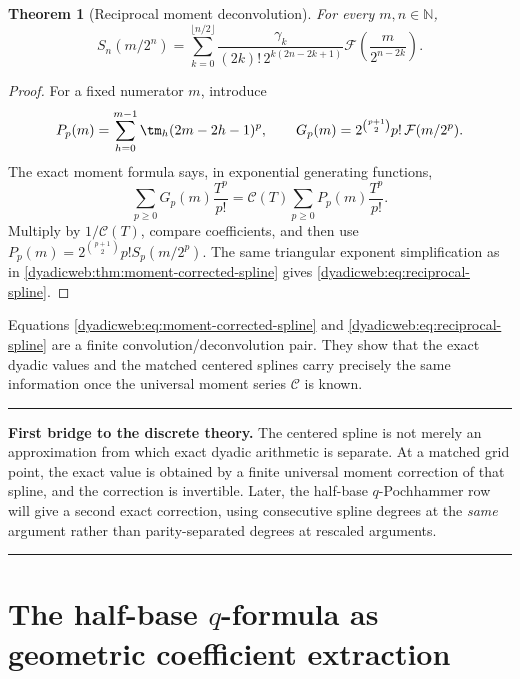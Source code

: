 \documentclass[11pt,oneside]{article}
\newtheorem{theorem}{Theorem}[section]
\theoremstyle{definition}
\theoremstyle{remark}
\newcommand{\N}{\mathbb N}
\newenvironment{boxedremark}{%
  \par\smallskip\noindent\begin{center}\begin{minipage}{0.94\textwidth}%
  \color{black}\hrule\vspace{0.6em}\small
}{%
  \vspace{0.6em}\hrule\end{minipage}\end{center}\smallskip
}
\begin{document}
\begin{theorem}[Reciprocal moment deconvolution]
\label{dyadicweb:thm:reciprocal-spline}
For every $m,n\in\N$,
\begin{equation}
 \boxed{
 S_n(m/2^n)=
 \sum_{k=0}^{\lfloor n/2\rfloor}
 \frac{\gamma_k}{(2k)!\,2^{k(2n-2k+1)}}
 \mathcal F\!\left(\frac{m}{2^{n-2k}}\right).}            \label{dyadicweb:eq:reciprocal-spline}
\end{equation}
\end{theorem}

\begin{proof}
For a fixed numerator $m$, introduce
\[
 P_p(m)=\sum_{h=0}^{m-1}\tm_h(2m-2h-1)^p,
 \qquad
 G_p(m)=2^{\binom{p+1}{2}}p!\,\mathcal F(m/2^p).
\]
The exact moment formula says, in exponential generating functions,
\[
 \sum_{p\ge0}G_p(m)\frac{T^p}{p!}
 =\mathscr C(T)\sum_{p\ge0}P_p(m)\frac{T^p}{p!}.
\]
Multiply by $1/\mathscr C(T)$, compare coefficients, and then use
$P_p(m)=2^{\binom{p+1}{2}}p!S_p(m/2^p)$.  The same triangular exponent simplification as in
\cref{dyadicweb:thm:moment-corrected-spline} gives \eqref{dyadicweb:eq:reciprocal-spline}.
\end{proof}

Equations \eqref{dyadicweb:eq:moment-corrected-spline} and \eqref{dyadicweb:eq:reciprocal-spline} are a finite
convolution/deconvolution pair.  They show that the exact dyadic values and the matched centered
splines carry precisely the same information once the universal moment series $\mathscr C$ is
known.

\begin{boxedremark}
\textbf{First bridge to the discrete theory.}
The centered spline is not merely an approximation from which exact dyadic arithmetic is
separate.  At a matched grid point, the exact value is obtained by a finite universal moment
correction of that spline, and the correction is invertible.  Later, the half-base
$q$-Pochhammer row will give a second exact correction, using consecutive spline degrees at
the \emph{same} argument rather than parity-separated degrees at rescaled arguments.
\end{boxedremark}

\section[The half-base q-formula as geometric coefficient extraction]{The half-base $q$-formula as geometric coefficient extraction}
\label{dyadicweb:sec:q-extraction}
\end{document}

